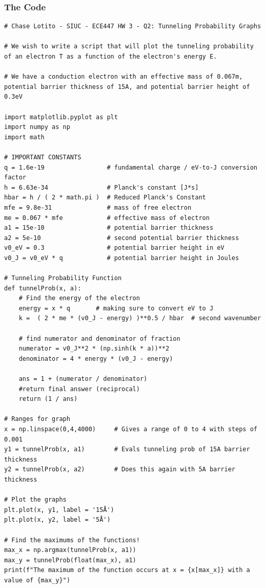 \documentclass{article}
\begin{document}
\subsubsection{The Code}

\begin{lstlisting}
# Chase Lotito - SIUC - ECE447 HW 3 - Q2: Tunneling Probability Graphs

# We wish to write a script that will plot the tunneling probability of an electron T as a function of the electron's energy E.

# We have a conduction electron with an effective mass of 0.067m, potential barrier thickness of 15A, and potential barrier height of 0.3eV

import matplotlib.pyplot as plt
import numpy as np
import math

# IMPORTANT CONSTANTS
q = 1.6e-19                 # fundamental charge / eV-to-J conversion factor
h = 6.63e-34                # Planck's constant [J*s]
hbar = h / ( 2 * math.pi )  # Reduced Planck's Constant
mfe = 9.8e-31               # mass of free electron
me = 0.067 * mfe            # effective mass of electron
a1 = 15e-10                 # potential barrier thickness
a2 = 5e-10                  # second potential barrier thickness
v0_eV = 0.3                 # potential barrier height in eV
v0_J = v0_eV * q            # potential barrier height in Joules

# Tunneling Probability Function
def tunnelProb(x, a):
    # Find the energy of the electron 
    energy = x * q       # making sure to convert eV to J
    k =  ( 2 * me * (v0_J - energy) )**0.5 / hbar  # second wavenumber
    
    # find numerator and denominator of fraction
    numerator = v0_J**2 * (np.sinh(k * a))**2 
    denominator = 4 * energy * (v0_J - energy)
    
    ans = 1 + (numerator / denominator)
    #return final answer (reciprocal)
    return (1 / ans)

# Ranges for graph
x = np.linspace(0,4,4000)     # Gives a range of 0 to 4 with steps of 0.001
y1 = tunnelProb(x, a1)        # Evals tunneling prob of 15A barrier thickness
y2 = tunnelProb(x, a2)        # Does this again with 5A barrier thickness

# Plot the graphs
plt.plot(x, y1, label = '15Å')
plt.plot(x, y2, label = '5Å')

# Find the maximums of the functions!
max_x = np.argmax(tunnelProb(x, a1))
max_y = tunnelProb(float(max_x), a1)
print(f"The maximum of the function occurs at x = {x[max_x]} with a value of {max_y}")


\end{lstlisting}
\end{document}
